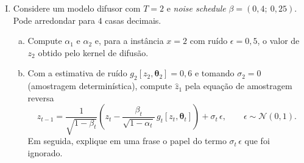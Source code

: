 \documentclass{dlproblemset}
\newcommand{\thetav}{\boldsymbol{\theta}}
\begin{document}
\begin{enumerate}[I)]
\item Considere um modelo difusor com $T = 2$ e \textit{noise schedule} $\beta = (0{,}4;\ 0{,}25)$. Pode arredondar para $4$ casas decimais.
\begin{enumerate}[(a)]
    \item Compute $\alpha_1$ e $\alpha_2$ e, para a instância $x = 2$ com ruído $\epsilon = 0{,}5$, o valor de $z_2$ obtido pelo kernel de difusão.
    \item Com a estimativa de ruído $g_2[z_2, \thetav_2] = 0{,}6$ e tomando $\sigma_2 = 0$ (amostragem determinística), compute $\hat{z}_1$ pela equação de amostragem reversa
    \[
    z_{t-1} = \frac{1}{\sqrt{1 - \beta_t}}\left(z_t - \frac{\beta_t}{\sqrt{1 - \alpha_t}}\, g_t[z_t, \thetav_t]\right) + \sigma_t\,\epsilon, \qquad \epsilon \sim \mathcal{N}(0, 1).
    \]
    Em seguida, explique em uma frase o papel do termo $\sigma_t\,\epsilon$ que foi ignorado.
\end{enumerate}

\end{enumerate}
\end{document}
